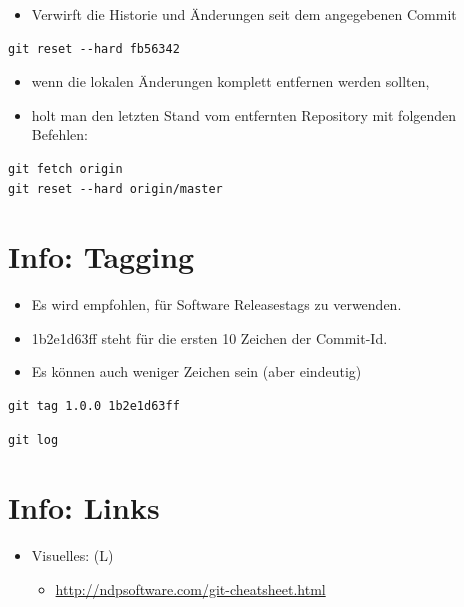 \documentclass[11pt]{article}
\begin{document}
\begin{itemize}
\item Verwirft die Historie und Änderungen seit dem angegebenen Commit
\end{itemize}
\begin{verbatim}
git reset --hard fb56342
\end{verbatim}


\begin{itemize}
\item wenn die lokalen Änderungen komplett entfernen werden sollten,
\item holt man den letzten Stand vom entfernten Repository mit folgenden Befehlen:
\end{itemize}

\begin{verbatim}
git fetch origin
git reset --hard origin/master
\end{verbatim}





\section{Info: Tagging}
\label{sec:org4f3c3fd}

\begin{itemize}
\item Es wird empfohlen, für Software Releasestags zu verwenden.
\item 1b2e1d63ff steht für die ersten 10 Zeichen der Commit-Id.
\item Es können auch weniger Zeichen sein (aber eindeutig)
\end{itemize}
\begin{verbatim}
git tag 1.0.0 1b2e1d63ff
\end{verbatim}

\begin{verbatim}
git log
\end{verbatim}


\section{Info: Links}
\label{sec:orge030f4b}

\begin{itemize}
\item Visuelles: (L)
\begin{itemize}
\item \url{http://ndpsoftware.com/git-cheatsheet.html}
\end{itemize}
\end{itemize}
\end{document}
